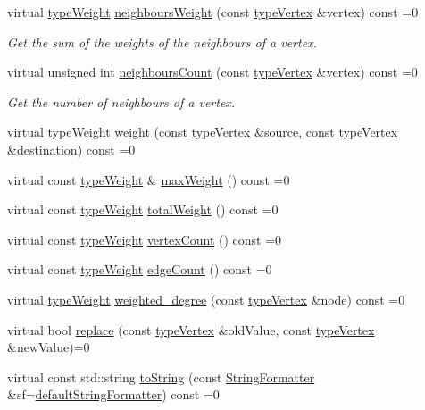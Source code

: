 \begin{DoxyCompactItemize}
virtual \hyperlink{edge_8h_a2e7ea3be891ac8b52f749ec73fee6dd2}{type\+Weight} \hyperlink{classGraphInterface_a62e1ed1899155eb63cf7ee82970cd415}{neighbours\+Weight} (const \hyperlink{edge_8h_a5fbd20c46956d479cb10afc9855223f6}{type\+Vertex} \&vertex) const =0
\begin{DoxyCompactList}\small\item\em Get the sum of the weights of the neighbours of a vertex. \end{DoxyCompactList}\item 
virtual unsigned int \hyperlink{classGraphInterface_ae9b85226881a84124ce6dbaba498edce}{neighbours\+Count} (const \hyperlink{edge_8h_a5fbd20c46956d479cb10afc9855223f6}{type\+Vertex} \&vertex) const =0
\begin{DoxyCompactList}\small\item\em Get the number of neighbours of a vertex. \end{DoxyCompactList}\item 
virtual \hyperlink{edge_8h_a2e7ea3be891ac8b52f749ec73fee6dd2}{type\+Weight} \hyperlink{classGraphInterface_a27f350094f566bb4840f22c5bc0695c4}{weight} (const \hyperlink{edge_8h_a5fbd20c46956d479cb10afc9855223f6}{type\+Vertex} \&source, const \hyperlink{edge_8h_a5fbd20c46956d479cb10afc9855223f6}{type\+Vertex} \&destination) const =0
\item 
virtual const \hyperlink{edge_8h_a2e7ea3be891ac8b52f749ec73fee6dd2}{type\+Weight} \& \hyperlink{classGraphInterface_a2fb0681f6cda5f8318adf7ee95df3685}{max\+Weight} () const =0
\item 
virtual const \hyperlink{edge_8h_a2e7ea3be891ac8b52f749ec73fee6dd2}{type\+Weight} \hyperlink{classGraphInterface_a3bf10ae8e4fc3b049b5e7ac23798b89f}{total\+Weight} () const =0
\item 
virtual const \hyperlink{edge_8h_a2e7ea3be891ac8b52f749ec73fee6dd2}{type\+Weight} \hyperlink{classGraphInterface_a483f64f8d37af2b363f2f4eb37943dfd}{vertex\+Count} () const =0
\item 
virtual const \hyperlink{edge_8h_a2e7ea3be891ac8b52f749ec73fee6dd2}{type\+Weight} \hyperlink{classGraphInterface_a057eb801c6d7f594cdedc205a0d081a9}{edge\+Count} () const =0
\item 
virtual \hyperlink{edge_8h_a2e7ea3be891ac8b52f749ec73fee6dd2}{type\+Weight} \hyperlink{classGraphInterface_a3a4bd9e37e69a4488a48f781e36ea686}{weighted\+\_\+degree} (const \hyperlink{edge_8h_a5fbd20c46956d479cb10afc9855223f6}{type\+Vertex} \&node) const =0
\item 
virtual bool \hyperlink{classGraphInterface_a448a3c66fb5650339f84366257d322ee}{replace} (const \hyperlink{edge_8h_a5fbd20c46956d479cb10afc9855223f6}{type\+Vertex} \&old\+Value, const \hyperlink{edge_8h_a5fbd20c46956d479cb10afc9855223f6}{type\+Vertex} \&new\+Value)=0
\item 
virtual const std\+::string \hyperlink{classGraphInterface_ac6d3da524ca5c95c3ebd80d2b0d5d762}{to\+String} (const \hyperlink{classStringFormatter}{String\+Formatter} \&sf=\hyperlink{stringFormatter_8h_abf1349c8e24162d0134072aff288f2a2}{default\+String\+Formatter}) const =0
\end{DoxyCompactItemize}


